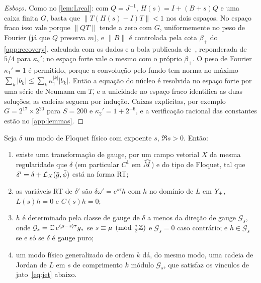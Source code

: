 \begin{proof}[Esboço]
Como no \cref{lem:Lreal}: com $Q=J^{-1}$, $H(s)=I+(B+s)Q$ e uma caixa finita $G$, basta que
$\|T(H(s)-I)T\|<1$ nos dois espaços. No espaço fraco isso vale porque $\|QT\|$ tende a zero com $G$,
uniformemente no peso de Fourier (já que $Q$ preserva $m$), e $\|B\|$ é controlada pela cota
$\beta_+$ do \cref{app:recovery}, calculada com os dados e a bola publicada de~\cite{RT2019}, reponderada de $5/4$
para $\kappa_2'$; no espaço forte vale o mesmo com o próprio $\beta_+$. O peso de Fourier $\kappa_1'=1$ é permitido, porque a convolução pelo fundo tem
norma no máximo $\sum_k|b_k|\le\sum_k\kappa_1^{|k|}|b_k|$. Então a equação do núcleo é resolvida no espaço forte
por uma série de Neumann em $T$, e a unicidade no espaço fraco identifica as duas soluções; as cadeias seguem por
indução. Caixas explícitas, por exemplo $G=2^{17}\times2^{20}$ para $S=200$ e $\kappa_2'=1+2^{-6}$, e a
verificação racional das constantes estão no \cref{app:lemmas}.
\end{proof}

\begin{lemma}\label{lem:R}
Seja $\delta$ um modo de Floquet físico com expoente $s$, $\Re s>0$. Então:
\begin{enumerate}[label=\textup{(\arabic*)},leftmargin=*]
\item existe uma transformação de gauge, por um campo vetorial $X$ da mesma regularidade que $\delta$ (em
  particular $C^1$ em $\widehat M$) e do tipo de Floquet, tal que $\delta'=\delta+\mathcal{L}_X(\bar g,\bar\phi)$ está na forma
  RT;
\item as variáveis RT de $\delta'$ são $\delta\omega'=e^{s\tau}h$ com $h$ no domínio de $L$ em $Y_{+}$,
  $L(s)h=0$ e $C(s)h=0$;
\item $h$ é determinado pela classe de gauge de $\delta$ a menos da direção de gauge
  $\mathcal G_s$, onde $\mathcal G_s=\mathbb{C}\,e^{(\mu-s)\tau}g_*$ se $s\equiv\mu\pmod{\tfrac i2\mathbb{Z}}$ e
  $\mathcal G_s=0$ caso contrário; e $h\in\mathcal G_s$ se e só se $\delta$ é gauge puro;
\item um modo físico generalizado de ordem $k$ dá, do mesmo modo, uma cadeia de Jordan de $L$ em $s$ de comprimento
  $k$ módulo $\mathcal G_s$, que satisfaz os vínculos de jato~\eqref{eq:jet} abaixo.
\end{enumerate}
\end{lemma}

